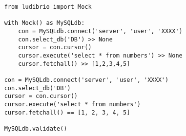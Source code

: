 \documentclass{article}
\begin{document}
\newpage

{
\LARGE \vspace{15pt}
\begin{lstlisting}
	from ludibrio import Mock

	with Mock() as MySQLdb:
		con = MySQLdb.connect('server', 'user', 'XXXX')
		con.select_db('DB') >> None
		cursor = con.cursor()
		cursor.execute('select * from numbers') >> None
		cursor.fetchall() >> [1,2,3,4,5]

	con = MySQLdb.connect('server', 'user', 'XXXX')
	con.select_db('DB')
	cursor = con.cursor()
	cursor.execute('select * from numbers')
	cursor.fetchall() == [1, 2, 3, 4, 5]

	MySQLdb.validate()
\end{lstlisting}
}

\newpage

\end{document}

